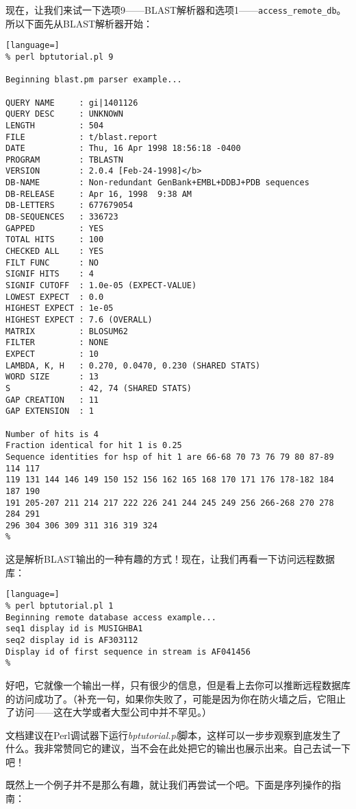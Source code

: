 现在，让我们来试一下选项9——BLAST解析器和选项1——\verb|access_remote_db|。所以下面先从BLAST解析器开始：

\begin{lstlisting}[language=]
% perl bptutorial.pl 9

Beginning blast.pm parser example... 

QUERY NAME     : gi|1401126
QUERY DESC     : UNKNOWN
LENGTH         : 504
FILE           : t/blast.report
DATE           : Thu, 16 Apr 1998 18:56:18 -0400
PROGRAM        : TBLASTN
VERSION        : 2.0.4 [Feb-24-1998]</b>
DB-NAME        : Non-redundant GenBank+EMBL+DDBJ+PDB sequences
DB-RELEASE     : Apr 16, 1998  9:38 AM
DB-LETTERS     : 677679054
DB-SEQUENCES   : 336723
GAPPED         : YES
TOTAL HITS     : 100
CHECKED ALL    : YES
FILT FUNC      : NO
SIGNIF HITS    : 4
SIGNIF CUTOFF  : 1.0e-05 (EXPECT-VALUE)
LOWEST EXPECT  : 0.0
HIGHEST EXPECT : 1e-05
HIGHEST EXPECT : 7.6 (OVERALL)
MATRIX         : BLOSUM62
FILTER         : NONE
EXPECT         : 10
LAMBDA, K, H   : 0.270, 0.0470, 0.230 (SHARED STATS)
WORD SIZE      : 13
S              : 42, 74 (SHARED STATS)
GAP CREATION   : 11
GAP EXTENSION  : 1

Number of hits is 4 
Fraction identical for hit 1 is 0.25 
Sequence identities for hsp of hit 1 are 66-68 70 73 76 79 80 87-89 114 117
119 131 144 146 149 150 152 156 162 165 168 170 171 176 178-182 184 187 190
191 205-207 211 214 217 222 226 241 244 245 249 256 266-268 270 278 284 291
296 304 306 309 311 316 319 324 
%
\end{lstlisting}

这是解析BLAST输出的一种有趣的方式！现在，让我们再看一下访问远程数据库：

\begin{lstlisting}[language=]
% perl bptutorial.pl 1
Beginning remote database access example... 
seq1 display id is MUSIGHBA1 
seq2 display id is AF303112 
Display id of first sequence in stream is AF041456
% 
\end{lstlisting}

好吧，它就像一个输出一样，只有很少的信息，但是看上去你可以推断远程数据库的访问成功了。（补充一句，如果你失败了，可能是因为你在防火墙之后，它阻止了访问——这在大学或者大型公司中并不罕见。）

文档建议在Perl调试器下运行\textit{bptutorial.pl}脚本，这样可以一步步观察到底发生了什么。我非常赞同它的建议，当不会在此处把它的输出也展示出来。自己去试一下吧！

既然上一个例子并不是那么有趣，就让我们再尝试一个吧。下面是序列操作的指南：

